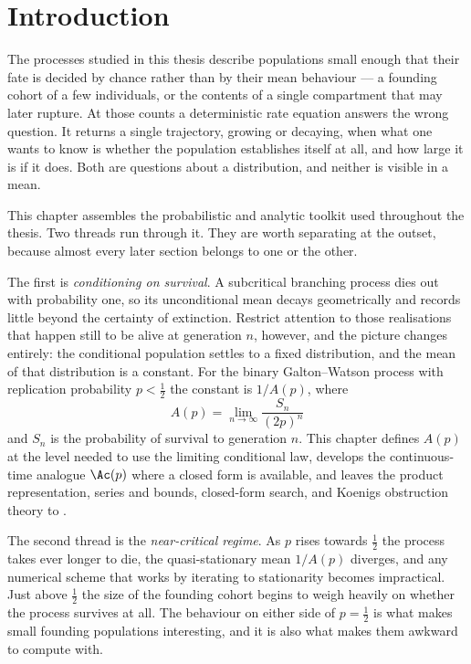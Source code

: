 \section{Introduction}
\label{m:sec:intro}

The processes studied in this thesis describe populations small enough that their
fate is decided by chance rather than by their mean behaviour --- a founding cohort
of a few individuals, or the contents of a single compartment that may later
rupture. At those counts a deterministic rate equation answers the wrong question.
It returns a single trajectory, growing or decaying, when what one wants to know is
whether the population establishes itself at all, and how large it is if it does.
Both are questions about a distribution, and neither is visible in a mean.

This chapter assembles the probabilistic and analytic toolkit used throughout the
thesis. Two threads run through it. They are worth separating at the outset,
because almost every later section belongs to one or the other.

The first is \emph{conditioning on survival}. A subcritical branching process dies
out with probability one, so its unconditional mean decays geometrically and
records little beyond the certainty of extinction. Restrict attention to those
realisations that happen still to be alive at generation $n$, however, and the
picture changes entirely: the conditional population settles to a fixed
distribution, and the mean of that distribution is a constant. For the binary
Galton--Watson process with replication probability $p<\tfrac12$ the constant is
$1/A(p)$, where
\begin{equation*}
A(p) = \lim_{n\to\infty}\frac{S_n}{(2p)^n}
\end{equation*}
and $S_n$ is the probability of survival to generation $n$. This chapter defines
$A(p)$ at the level needed to use the limiting conditional law, develops the
continuous-time analogue $\Ac(p)$ where a closed form is available, and leaves the
product representation, series and bounds, closed-form search, and Koenigs
obstruction theory to \ChA.

The second thread is the \emph{near-critical regime}. As $p$ rises towards
$\tfrac12$ the process takes ever longer to die, the quasi-stationary mean $1/A(p)$
diverges, and any numerical scheme that works by iterating to stationarity becomes
impractical. Just above $\tfrac12$ the size of the founding cohort begins to weigh
heavily on whether the process survives at all. The behaviour on either side of
$p=\tfrac12$ is what makes small founding populations interesting, and it is also
what makes them awkward to compute with.

